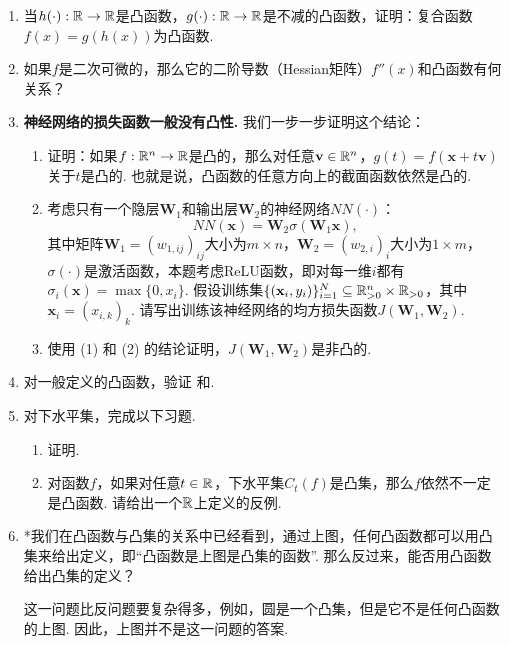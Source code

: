 \begin{enumerate}[wide, labelindent=0pt]
    \item \label{exercise:convex-operation} 当$h(\cdot):\mathbb{R}\to\mathbb{R}$是凸函数，$g(\cdot):\mathbb{R}\to\mathbb{R}$是不减的凸函数，证明：复合函数$f(x) = g(h(x))$为凸函数.
    
    \item 如果$f$是二次可微的，那么它的二阶导数（Hessian矩阵）$f''(x)$和凸函数有何关系？

    \item \textbf{神经网络的损失函数一般没有凸性.} 我们一步一步证明这个结论：
        \begin{enumerate}
            \item 证明：如果$f:\mathbb{R}^n\to \mathbb{R}$是凸的，那么对任意$\mathbf v\in\mathbb{R}^n$，$g(t) = f(\mathbf x+t\mathbf v)$关于$t$是凸的. 也就是说，凸函数的任意方向上的截面函数依然是凸的.
            \item 考虑只有一个隐层$\mathbf W_1$和输出层$\mathbf W_2$的神经网络$NN(\cdot)$：
            \[NN(\mathbf{x})= \mathbf W_2\sigma(\mathbf W_1\mathbf{x}),\]
            其中矩阵$\mathbf W_1=(w_{1,ij})_{ij}$大小为$m\times n$，$\mathbf W_2=(w_{2,i})_i$大小为$1\times m$，$\sigma(\cdot)$是激活函数，本题考虑ReLU函数，即对每一维$i$都有$\sigma_i(\mathbf x)=\max\{0,x_i\}$. 假设训练集$\{(\mathbf{x}_i,y_i)\}_{i=1}^N\subseteq \mathbb{R}_{>0}^n\times \mathbb{R}_{>0}$，其中$\mathbf x_i=(x_{i,k})_k$. 请写出训练该神经网络的均方损失函数$J(\mathbf W_1,\mathbf W_2)$.
            \item 使用 (1) 和 (2) 的结论证明，$J(\mathbf W_1,\mathbf W_2)$是非凸的.
        \end{enumerate}

    \item \label{exercise:convex-function-general-property} 对一般定义的凸函数，验证 和.
    
    \item \label{exercise:convex-level-set} 对下水平集，完成以下习题. 
    \begin{enumerate}
        \item 证明. 
        \item 对函数$f$，如果对任意$t\in\mathbb{R}$，下水平集$C_t(f)$是凸集，那么$f$依然不一定是凸函数. 请给出一个$\mathbb{R}$上定义的反例.
    \end{enumerate}
    
    \item *我们在凸函数与凸集的关系中已经看到，通过上图，任何凸函数都可以用凸集来给出定义，即“凸函数是上图是凸集的函数”. 那么反过来，能否用凸函数给出凸集的定义？
    \begin{hint}
        这一问题比反问题要复杂得多，例如，圆是一个凸集，但是它不是任何凸函数的上图. 因此，上图并不是这一问题的答案.
    \end{hint}
    

\end{enumerate}
